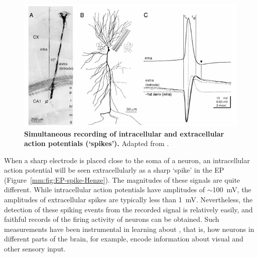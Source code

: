 \begin{figure}[!ht]
\begin{center}
\includegraphics{Figures/Spikes/EP-spike-Henze-w100-r150}
\end{center}
\caption{\textbf{Simultaneous recording of intracellular and extracellular action potentials (`spikes').}
Adapted from \citet{Henze2000}.
}
\label{spikes:sec:fig:EP-spike-Henze}
\end{figure}


When a sharp electrode is placed close to the soma of a neuron, an intracellular action potential will be seen
extracellularly as a sharp `spike' in the EP (Figure~\ref{mm:fig:EP-spike-Henze}). The magnitudes of these signals are quite different. While intracellular action potentials have amplitudes of $\sim$100~mV, the amplitudes of extracellular
spikes are typically less than 1~mV. Nevertheless, the detection of these spiking events from the recorded signal is relatively easily, and faithful records of the firing activity of neurons can be obtained. Such measurements have been instrumental in learning about , that is, how neurons in different parts of the brain, for example, encode information about visual and other sensory input. 


